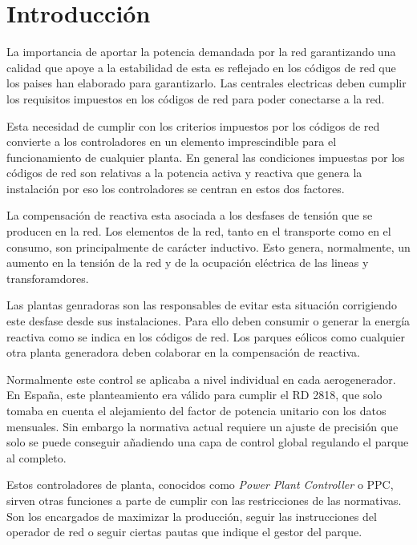 \documentclass{book}
\begin{document}
\tableofcontents %

\chapter{Introducci\'on}

La importancia de aportar la potencia demandada por la red garantizando una calidad que apoye a la estabilidad de esta es reflejado en los c\'odigos de red que los paises han elaborado para garantizarlo. Las centrales electricas deben cumplir los requisitos impuestos en los c\'odigos de red para poder conectarse a la red. \par

Esta necesidad de cumplir con los criterios impuestos por los c\'odigos de red convierte a los controladores en un elemento imprescindible para el funcionamiento de cualquier planta. En general las condiciones impuestas por los c\'odigos de red son relativas a la potencia activa y reactiva que genera la instalaci\'on por eso los controladores se centran en estos dos factores. \par

La compensaci\'on de reactiva esta asociada a los desfases de tensi\'on que se producen en la red. Los elementos de la red, tanto en el transporte como en el consumo, son principalmente de car\'acter inductivo. Esto genera, normalmente, un aumento en la tensi\'on de la red y de la ocupaci\'on el\'ectrica de las lineas y transforamdores. \par

Las plantas genradoras son las responsables de evitar esta situaci\'on corrigiendo este desfase desde sus instalaciones. Para ello deben consumir o generar la energ\'ia reactiva como se indica en los c\'odigos de red. Los parques e\'olicos como cualquier otra planta generadora deben colaborar en la compensaci\'on de reactiva. \par

Normalmente este control se aplicaba a nivel individual en cada aerogenerador. En España, este planteamiento era v\'alido para cumplir el RD 2818, que solo tomaba en cuenta el alejamiento del factor de potencia unitario con los datos mensuales. Sin embargo la normativa actual requiere un ajuste de precisi\'on que solo se puede conseguir añadiendo una capa de control global regulando el parque al completo. \par

Estos controladores de planta, conocidos como \emph{Power Plant Controller} o PPC, sirven otras funciones a parte de cumplir con las restricciones de las normativas. Son los encargados de maximizar la producci\'on, seguir las instrucciones del operador de red o seguir ciertas pautas que indique el gestor del parque. \par
\end{document}
